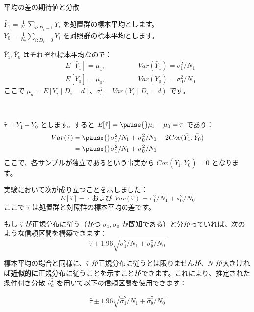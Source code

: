 \documentclass[11pt,handout]{beamer}
\newenvironment{wideitemize}{\itemize\addtolength{\itemsep}{10pt}}{\enditemize}
\begin{document}
\begin{frame}{平均の差の期待値と分散}
\begin{wideitemize}
			\item
			$\bar{Y}_1 = \frac{1}{N_1} \sum_{i: D_i = 1}  Y_i $ を処置群の標本平均とします。 \\
			$\bar{Y}_0 = \frac{1}{N_0} \sum_{i: D_i = 0}  Y_i $ を対照群の標本平均とします。 
			
			\pause 
			\item
			$\bar{Y}_1, \bar{Y}_0$ はそれぞれ標本平均なので： \pause 
			\begin{align*}
			& E[\bar{Y}_1] = \mu_1, \hspace{2cm} Var(\bar{Y}_1) = \sigma_1^2 / N_1 \\
			& E[\bar{Y}_0] = \mu_0, \hspace{2cm} Var(\bar{Y_0}) = \sigma_0^2 / N_0 
			\end{align*} 
		\noindent ここで $\mu_d = E[Y_i \mid D_i=d]$、$\sigma_d^2 = Var(Y_i \mid D_i = d)$ です。
		
		\
		
			\item
			$\hat\tau = \bar{Y}_1 - \bar{Y}_0$ とします。すると $E[\hat\tau] = \pause{}\mu_1 - \mu_0 = \tau$ であり：
			\begin{align*}
			Var( \hat\tau ) &=  \pause{} \sigma_1^2 / N_1 +  \sigma_0^2 / N_0 - 2 Cov(\bar{Y_1}, \bar{Y_0})\\
			& = \pause{}\sigma_1^2 / N_1 +  \sigma_0^2 / N_0 
					\end{align*}
			\noindent ここで、各サンプルが独立であるという事実から $Cov(\bar{Y_1}, \bar{Y_0}) = 0$ となります。
\end{wideitemize}
\end{frame}

\begin{frame}
	\begin{wideitemize}
		\item
		実験において次が成り立つことを示しました：
		$$E[\hat\tau] = \tau \text{ および } Var(\hat\tau) = \sigma_1^2/N_1 + \sigma_0^2 / N_0$$
		ここで $\hat\tau$ は処置群と対照群の標本平均の差です。
		
		\item
		もし $\hat\tau$ が正規分布に従う（かつ $\sigma_1, \sigma_0$ が既知である）と分かっていれば、次のような信頼区間を構築できます： \pause
		$$ \hat\tau \pm 1.96 \sqrt{\sigma_1^2/N_1 + \sigma_0^2 / N_0} $$
		
		\pause 
		\item
		標本平均の場合と同様に、$\hat\tau$ が正規分布に従うとは限りませんが、$N$ が大きければ\textbf{近似的に}正規分布に従うことを示すことができます。これにより、推定された条件付き分散 $\hat\sigma_d^2$ を用いて以下の信頼区間を使用できます：
		
		 $$ \hat\tau \pm 1.96 \sqrt{\hat\sigma_1^2/N_1 + \hat\sigma_0^2 / N_0} $$
		 
	\end{wideitemize}
\end{frame}
\end{document}
